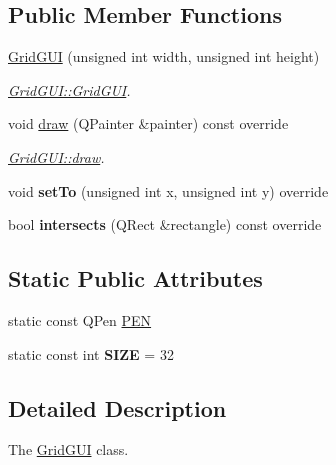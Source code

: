 \subsection*{Public Member Functions}
\begin{DoxyCompactItemize}
\item 
\hyperlink{classGridGUI_a26a49d8e03b995f94d4ba2f962447755}{Grid\-G\-U\-I} (unsigned int width, unsigned int height)
\begin{DoxyCompactList}\small\item\em \hyperlink{classGridGUI_a26a49d8e03b995f94d4ba2f962447755}{Grid\-G\-U\-I\-::\-Grid\-G\-U\-I}. \end{DoxyCompactList}\item 
void \hyperlink{classGridGUI_a733eb9089f663b943a4df35bd0deb0e9}{draw} (Q\-Painter \&painter) const override
\begin{DoxyCompactList}\small\item\em \hyperlink{classGridGUI_a733eb9089f663b943a4df35bd0deb0e9}{Grid\-G\-U\-I\-::draw}. \end{DoxyCompactList}\item 
\hypertarget{classGridGUI_a5a766544081b2b32622599271b8fdac3}{void {\bfseries set\-To} (unsigned int x, unsigned int y) override}\label{classGridGUI_a5a766544081b2b32622599271b8fdac3}

\item 
\hypertarget{classGridGUI_ad39aea9c016151e90c8809878a89ed0d}{bool {\bfseries intersects} (Q\-Rect \&rectangle) const override}\label{classGridGUI_ad39aea9c016151e90c8809878a89ed0d}

\end{DoxyCompactItemize}
\subsection*{Static Public Attributes}
\begin{DoxyCompactItemize}
\item 
static const Q\-Pen \hyperlink{classGridGUI_a0bdab0ceaf6c0009b26b344bb20e75a4}{P\-E\-N}
\item 
\hypertarget{classGridGUI_ae526a7b1f11279b5ec1515eb4e19c250}{static const int {\bfseries S\-I\-Z\-E} = 32}\label{classGridGUI_ae526a7b1f11279b5ec1515eb4e19c250}

\end{DoxyCompactItemize}


\subsection{Detailed Description}
The \hyperlink{classGridGUI}{Grid\-G\-U\-I} class. 

